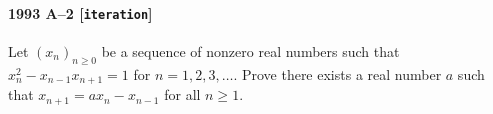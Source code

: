 \paragraph{1993 A--2 \textnormal{[\texttt{iteration}]}}
Let $(x_n)_{n \geq 0}$ be a sequence of nonzero real numbers
such that $x_n^2 - x_{n-1}x_{n+1} = 1$ for $n=1,2,3,\dots$. Prove there
exists a real number $a$ such that $x_{n+1} = ax_n - x_{n-1}$ for all $n
\geq 1$.
